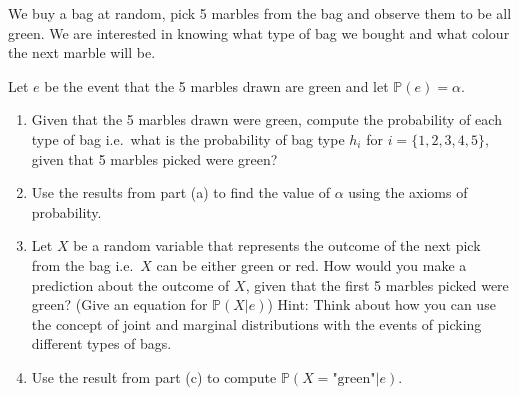 \documentclass[11pt,onecolumn]{article}
\begin{document}
\begin{enumerate}
    We buy a bag at random, pick 5 marbles from the bag and observe them to be all green. We are interested in knowing what type of bag we bought and what colour the next marble will be. 
    
    Let $e$ be the event that the 5 marbles drawn are green and let $\mathbb{P}(e) = \alpha$. 
    
    \begin{enumerate}
        \item Given that the 5 marbles drawn were green, compute the probability of each type of bag i.e.\ what is the probability of bag type $h_i$ for $i = \{1, 2, 3, 4, 5\}$, given that 5 marbles picked were green?
        
        \item Use the results from part (a) to find the value of $\alpha$ using the axioms of probability.
        
        \item Let $X$ be a random variable that represents the outcome of the next pick from the bag i.e.\ $X$ can be either green or red. How would you make a prediction about the outcome of $X$, given that the first 5 marbles picked were green? (Give an equation for $\mathbb{P}(X|e)$) Hint: Think about how you can use the concept of joint and marginal distributions with the events of picking different types of bags.
        
        \item Use the result from part (c) to compute $\mathbb{P}(X=\text{"green"} |e)$.
        
    \end{enumerate}
\end{enumerate} 
\end{document}
